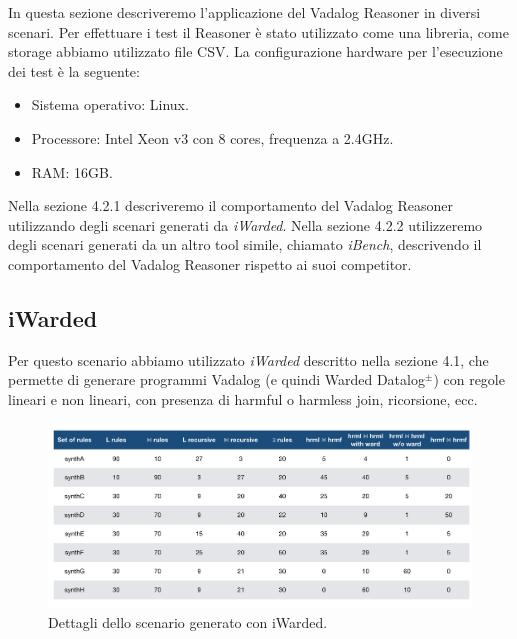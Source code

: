 In questa sezione descriveremo l'applicazione del Vadalog Reasoner in diversi scenari.\newline
Per effettuare i test il Reasoner è stato utilizzato come una libreria, come storage abbiamo utilizzato file CSV. \newline
La configurazione hardware per l'esecuzione dei test è la seguente:
\begin{itemize}
	\item Sistema operativo: Linux.
	\item Processore: Intel Xeon v3 con 8 cores, frequenza a 2.4GHz.
	\item RAM: 16GB.
\end{itemize}
Nella sezione 4.2.1 descriveremo il comportamento del Vadalog Reasoner utilizzando degli scenari generati da \emph{iWarded}. \newline
Nella sezione 4.2.2 utilizzeremo degli scenari generati da un altro tool simile, chiamato \emph{iBench}, descrivendo il comportamento del Vadalog Reasoner rispetto ai suoi competitor. \newline

\subsection{iWarded}

Per questo scenario abbiamo utilizzato \emph{iWarded} descritto nella sezione 4.1, che permette di generare programmi Vadalog (e quindi Warded Datalog$^\pm$) con regole lineari e non lineari, con presenza di harmful o harmless join, ricorsione, ecc. \newline
\begin{figure}[h]
	\centering
	\includegraphics[width=0.8\linewidth]{figure/iWardedScenario}
	\caption{Dettagli dello scenario generato con iWarded.}
	\label{fig:iwarded}
\end{figure}

